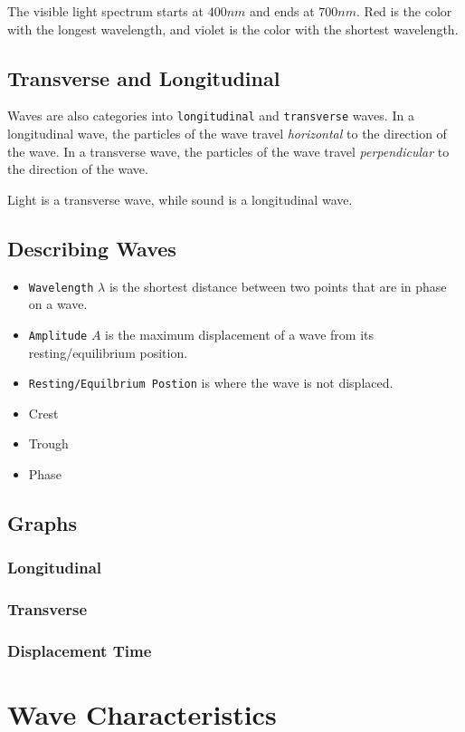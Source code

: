 \documentclass[../notes.tex]{subfiles}
\begin{document}
The visible light spectrum starts at $400nm$ and ends at $700nm$.
Red is the color with the longest wavelength, and violet is the color with the shortest wavelength.

\subsection{Transverse and Longitudinal}
Waves are also categories into \texttt{longitudinal} and \texttt{transverse} waves.
In a longitudinal wave, the particles of the wave travel \textit{horizontal} to the direction of the wave.
In a transverse wave, the particles of the wave travel \textit{perpendicular} to the direction of the wave.

Light is a transverse wave, while sound is a longitudinal wave.

\subsection{Describing Waves}
\begin{itemize}
    \item \texttt{Wavelength} $\lambda$ is the shortest distance between two points that are in phase on a wave.
    \item \texttt{Amplitude} $A$ is the maximum displacement of a wave from its resting/equilibrium position.
    \item \texttt{Resting/Equilbrium Postion} is where the wave is not displaced.
    \item Crest
    \item Trough
    \item Phase
\end{itemize}

\subsection{Graphs}

\subsubsection{Longitudinal}

\subsubsection{Transverse}

\subsubsection{Displacement Time}

\section{Wave Characteristics}
\end{document}
